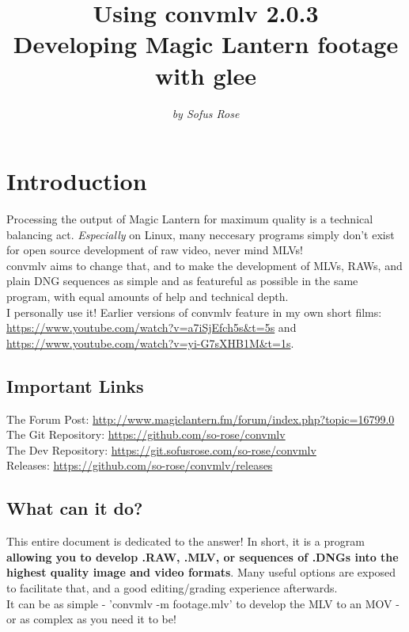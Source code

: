 \documentclass[a4paper,12pt]{article}
\author{\textit{by Sofus Rose}}
\title{\textbf{Using convmlv 2.0.3} \\ {\large Developing Magic Lantern footage with glee}}
\begin{document}
\maketitle{}
\tableofcontents{}
\newpage

\section{Introduction}
	Processing the output of Magic Lantern for maximum quality is a technical balancing act. \textit{Especially} on Linux, many
	neccesary programs simply don't exist for open source development of raw video, never mind MLVs!\\
	
	convmlv aims to change that, and to make the development of MLVs, RAWs, and plain DNG sequences as simple and as featureful as
	possible in the same program, with equal amounts of help and technical depth.\\
	
	I personally use it! Earlier versions of convmlv feature in my own short films:
	\url{https://www.youtube.com/watch?v=a7iSjEfch5s&t=5s} and \url{https://www.youtube.com/watch?v=yi-G7sXHB1M&t=1s}.
	
	\subsection{Important Links}
		The Forum Post: \url{http://www.magiclantern.fm/forum/index.php?topic=16799.0}\\
		The Git Repository: \url{https://github.com/so-rose/convmlv}\\
		The Dev Repository: \url{https://git.sofusrose.com/so-rose/convmlv}\\
		Releases: \url{https://github.com/so-rose/convmlv/releases}\\
	
	\subsection{What can it do?}
		This entire document is dedicated to the answer! In short, it is a program \textbf{allowing you to develop .RAW, .MLV, or sequences of .DNGs
		into the highest quality image and video formats}. Many useful options are exposed to facilitate that, and a good editing/grading experience afterwards.\\
		
		It can be as simple - 'convmlv -m footage.mlv' to develop the MLV to an MOV - or as complex as you need it to be!
\end{document}

